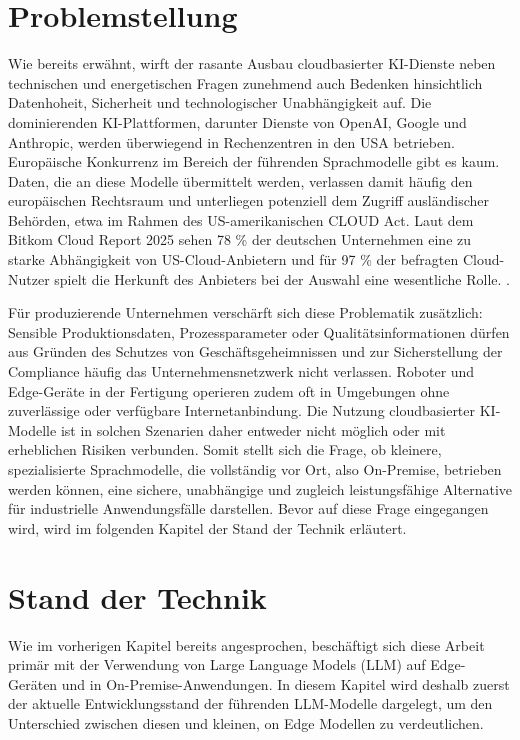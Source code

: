 \section{Problemstellung}

Wie bereits erwähnt, wirft der rasante Ausbau cloudbasierter KI-Dienste neben technischen und energetischen Fragen zunehmend auch Bedenken hinsichtlich Datenhoheit, Sicherheit und technologischer Unabhängigkeit auf.
Die dominierenden KI-Plattformen, darunter Dienste von OpenAI, Google und Anthropic, werden überwiegend in Rechenzentren in den USA betrieben.
Europäische Konkurrenz im Bereich der führenden Sprachmodelle gibt es kaum.
Daten, die an diese Modelle übermittelt werden, verlassen damit häufig den europäischen Rechtsraum und unterliegen potenziell dem Zugriff ausländischer Behörden, etwa im Rahmen des US-amerikanischen CLOUD Act.
Laut dem Bitkom Cloud Report 2025 sehen 78 \% der deutschen Unternehmen eine zu starke Abhängigkeit von US-Cloud-Anbietern und für 97 \% der befragten Cloud-Nutzer spielt die Herkunft des Anbieters bei der Auswahl eine wesentliche Rolle. \cite{bitkom2025cloud}.

Für produzierende Unternehmen verschärft sich diese Problematik zusätzlich: Sensible Produktionsdaten, Prozessparameter oder Qualitätsinformationen dürfen aus Gründen des Schutzes von Geschäftsgeheimnissen und zur Sicherstellung der Compliance häufig das Unternehmensnetzwerk nicht verlassen.
Roboter und Edge-Geräte in der Fertigung operieren zudem oft in Umgebungen ohne zuverlässige oder verfügbare Internetanbindung.
Die Nutzung cloudbasierter KI-Modelle ist in solchen Szenarien daher entweder nicht möglich oder mit erheblichen Risiken verbunden.
Somit stellt sich die Frage, ob kleinere, spezialisierte Sprachmodelle, die vollständig vor Ort, also On-Premise, betrieben werden können, eine sichere, unabhängige und zugleich leistungsfähige Alternative für industrielle Anwendungsfälle darstellen. Bevor auf diese Frage eingegangen wird, wird im folgenden Kapitel der Stand der Technik erläutert.

\section{Stand der Technik}

Wie im vorherigen Kapitel bereits angesprochen, beschäftigt sich diese Arbeit primär mit der Verwendung von Large Language Models (LLM) auf Edge-Geräten und in On-Premise-Anwendungen. In diesem Kapitel wird deshalb zuerst der aktuelle Entwicklungsstand der führenden LLM-Modelle dargelegt, um den Unterschied zwischen diesen und kleinen, on Edge Modellen zu verdeutlichen.

